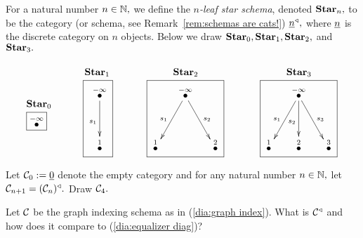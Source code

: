 \documentclass[CT4S-EN-RU]{subfiles}
\begin{document}
\begin{exampleENG}\label{ex:stars}
For a natural number $n\in{\mathbb N},$ we define the {\em $n$-leaf star schema}, denoted ${\mathbf{Star}}_n,$ to be the category (or schema, see Remark~\ref{rem:schemas are cats!}) $\underline{n}^\triangleleft,$ where $\underline{n}$ is the discrete category on $n$ objects. Below we draw ${\mathbf{Star}}_0, {\mathbf{Star}}_1, {\mathbf{Star}}_2,$ and ${\mathbf{Star}}_3.$
$$
\parbox{.3in}{\boxtitle{$\Star_0$}\fbox{$\LMO{-\infty}$}}
\hspace{.5in}
\parbox{.4in}{\boxtitle{$\Star_1$}\fbox{\xymatrix@=15pt{\LMO{-\infty}\ar[dd]_{s_1}\\\\\LMO{1}}}}
\hspace{.5in}
\parbox{1.1in}{\boxtitle{$\Star_2$}\fbox{\xymatrix@=15pt{&\LMO{-\infty}\ar[ddl]_{s_1}\ar[ddr]^{s_2}\\\\\LMO{1}&&\LMO{2}}}}
\hspace{.5in}
\parbox{1.1in}{\boxtitle{$\Star_3$}\fbox{\xymatrix@=15pt{&\LMO{-\infty}\ar[ddl]_{s_1}\ar[dd]_{s_2}\ar[ddr]^{s_3}\\\\\LMO{1}&\LMO{2}&\LMO{3}}}}
$$
\end{exampleENG}

\begin{exampleRUS}\label{ex:stars}
\end{exampleRUS}

\begin{exerciseENG}
Let $\mathcal{C}_0:=\underline{0}$ denote the empty category and for any natural number $n\in{\mathbb N},$ let $\mathcal{C}_{n+1}=(\mathcal{C}_n)^\triangleleft.$ Draw $\mathcal{C}_4.$  
\end{exerciseENG}

\begin{exerciseRUS}
\end{exerciseRUS}

\begin{exerciseENG}
Let $\mathcal{C}$ be the graph indexing schema as in (\ref{dia:graph index}). What is $\mathcal{C}^\triangleleft$ and how does it compare to (\ref{dia:equalizer diag})? 
\end{exerciseENG}

\begin{exerciseRUS}
\end{exerciseRUS}
\end{document}
